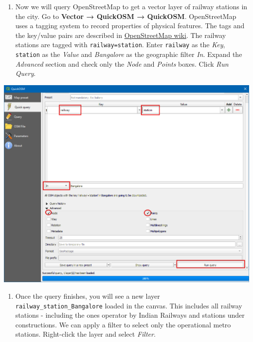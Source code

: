 \documentclass[
  12pt,
  a4paper]{article}
\providecommand{\tightlist}{%
  \setlength{\itemsep}{0pt}\setlength{\parskip}{0pt}}
\begin{document}
\begin{enumerate}
\def\labelenumi{\arabic{enumi}.}
\setcounter{enumi}{1}
\tightlist
\item
  Now we will query OpenStreetMap to get a vector layer of railway
  stations in the city. Go to \textbf{Vector → QuickOSM → QuickOSM}.
  OpenStreetMap uses a tagging system to record properties of physical
  features. The tags and the key/value pairs are described in
  \href{https://wiki.openstreetmap.org/wiki/Map_Features}{OpenStreetMap
  wiki}. The railway stations are tagged with \texttt{railway=station}.
  Enter \texttt{railway} as the \emph{Key}, \texttt{station} as the
  \emph{Value} and \emph{Bangalore} as the geographic filter \emph{In}.
  Expand the \emph{Advanced} section and check only the \emph{Node} and
  \emph{Points} boxes. Click \emph{Run Query}.
\end{enumerate}

\begin{center}\includegraphics[width=0.75\linewidth]{images/spatial_data_viz/pop2} \end{center}

\begin{enumerate}
\def\labelenumi{\arabic{enumi}.}
\setcounter{enumi}{2}
\tightlist
\item
  Once the query finishes, you will see a new layer
  \texttt{railway\_station\_Bangalore} loaded in the canvas. This
  includes all railway stations - including the ones operator by Indian
  Railways and stations under constructions. We can apply a filter to
  select only the operational metro stations. Right-click the layer and
  select \emph{Filter}.
\end{enumerate}
\end{document}
